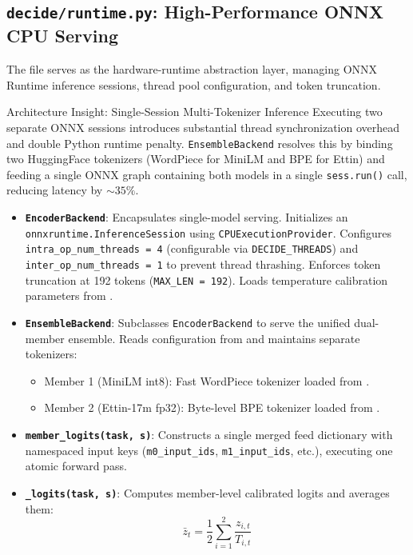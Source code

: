 \documentclass[11pt,a4paper]{article}
\begin{document}
\subsection{\texttt{decide/runtime.py}: High-Performance ONNX CPU Serving}
The file  serves as the hardware-runtime abstraction layer, managing ONNX Runtime inference sessions, thread pool configuration, and token truncation.

\begin{ossbox}{Architecture Insight: Single-Session Multi-Tokenizer Inference}
Executing two separate ONNX sessions introduces substantial thread synchronization overhead and double Python runtime penalty. \texttt{EnsembleBackend} resolves this by binding two HuggingFace tokenizers (WordPiece for MiniLM and BPE for Ettin) and feeding a single ONNX graph containing both models in a single \texttt{sess.run()} call, reducing latency by $\sim 35\%$.
\end{ossbox}

\begin{itemize}
  \item \textbf{\texttt{EncoderBackend}}: Encapsulates single-model serving. Initializes an \texttt{onnxruntime.InferenceSession} using \texttt{CPUExecutionProvider}. Configures \texttt{intra\_op\_num\_threads = 4} (configurable via \texttt{DECIDE\_THREADS}) and \texttt{inter\_op\_num\_threads = 1} to prevent thread thrashing. Enforces token truncation at 192 tokens (\texttt{MAX\_LEN = 192}). Loads temperature calibration parameters from .
  \item \textbf{\texttt{EnsembleBackend}}: Subclasses \texttt{EncoderBackend} to serve the unified dual-member ensemble. Reads configuration from  and maintains separate tokenizers:
    \begin{itemize}
      \item Member 1 (MiniLM int8): Fast WordPiece tokenizer loaded from .
      \item Member 2 (Ettin-17m fp32): Byte-level BPE tokenizer loaded from .
    \end{itemize}
  \item \textbf{\texttt{member\_logits(task, s)}}: Constructs a single merged feed dictionary with namespaced input keys (\texttt{m0\_input\_ids}, \texttt{m1\_input\_ids}, etc.), executing one atomic forward pass.
  \item \textbf{\texttt{\_logits(task, s)}}: Computes member-level calibrated logits and averages them:
  $$\bar{z}_t = \frac{1}{2} \sum_{i=1}^2 \frac{z_{i, t}}{T_{i, t}}$$
\end{itemize}
\end{document}
